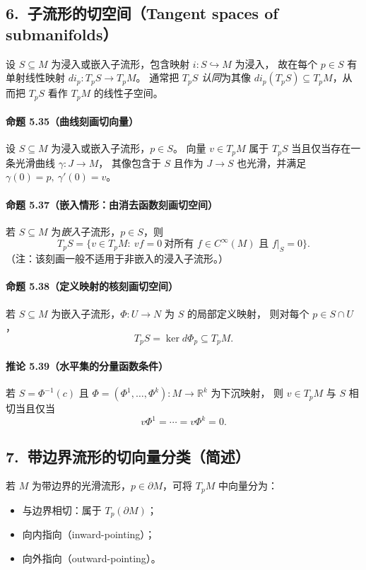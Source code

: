 \documentclass[11pt,a4paper]{article}
\begin{document}
\subsection*{6.\ 子流形的切空间（Tangent spaces of submanifolds）}

设 $S\subseteq M$ 为浸入或嵌入子流形，包含映射 $i:S\hookrightarrow M$ 为浸入，
故在每个 $p\in S$ 有单射线性映射 $di_p:T_pS\to T_pM$。
通常把 $T_pS$ \emph{认同}为其像 $di_p(T_pS)\subseteq T_pM$，从而把 $T_pS$ 看作 $T_pM$ 的线性子空间。

\paragraph{命题 5.35（曲线刻画切向量）}
设 $S\subseteq M$ 为浸入或嵌入子流形，$p\in S$。
向量 $v\in T_pM$ 属于 $T_pS$ 当且仅当存在一条光滑曲线 $\gamma:J\to M$，
其像包含于 $S$ 且作为 $J\to S$ 也光滑，并满足 $\gamma(0)=p,\ \gamma'(0)=v$。

\paragraph{命题 5.37（嵌入情形：由消去函数刻画切空间）}
若 $S\subseteq M$ 为\emph{嵌入}子流形，$p\in S$，则
\[
T_pS=\{v\in T_pM:\ vf=0\ \text{对所有 } f\in C^\infty(M)\text{ 且 } f|_S=0\}.
\]
（注：该刻画一般不适用于非嵌入的浸入子流形。）

\paragraph{命题 5.38（定义映射的核刻画切空间）}
若 $S\subseteq M$ 为嵌入子流形，$\Phi:U\to N$ 为 $S$ 的局部定义映射，
则对每个 $p\in S\cap U$，
\[
T_pS=\ker d\Phi_p\subseteq T_pM.
\]

\paragraph{推论 5.39（水平集的分量函数条件）}
若 $S=\Phi^{-1}(c)$ 且 $\Phi=(\Phi^1,\dots,\Phi^k):M\to\mathbb{R}^k$ 为下沉映射，
则 $v\in T_pM$ 与 $S$ 相切当且仅当
\[
v\Phi^1=\cdots=v\Phi^k=0.
\]

\subsection*{7.\ 带边界流形的切向量分类（简述）}

若 $M$ 为带边界的光滑流形，$p\in\partial M$，可将 $T_pM$ 中向量分为：
\begin{itemize}
  \item 与边界相切：属于 $T_p(\partial M)$；
  \item 向内指向（inward-pointing）；
  \item 向外指向（outward-pointing）。
\end{itemize}
\end{document}
